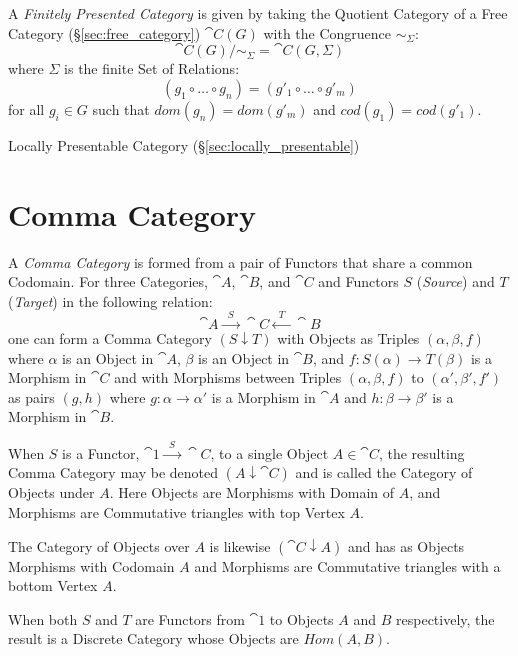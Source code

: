 A \emph{Finitely Presented Category} is given by taking the Quotient
Category of a Free Category (\S\ref{sec:free_category})
$\cat{C}(G)$ with the Congruence $\sim_\Sigma$:
\[
  \cat{C}(G) / \sim_{\Sigma} = \cat{C}(G,\Sigma)
\]
where $\Sigma$ is the finite Set of Relations:
\[
  (g_1 \circ \ldots \circ g_n) = (g'_1 \circ \ldots \circ g'_m)
\]
for all $g_i \in G$ such that $dom(g_n) = dom(g'_m)$ and $cod(g_1) =
cod(g'_1)$.

\fist Locally Presentable Category (\S\ref{sec:locally_presentable})



\section{Comma Category}\label{sec:comma_category}

A \emph{Comma Category} is formed from a pair of Functors that share a
common Codomain. For three Categories, $\cat{A}$, $\cat{B}$, and
$\cat{C}$ and Functors $S$ (\emph{Source}) and $T$ (\emph{Target}) in
the following relation:
\[
  \cat{A} \xrightarrow{\;\; S\;\;} \cat{C} \xleftarrow{\;\;
    T\;\;} \cat{B}
\]
one can form a Comma Category $(S \downarrow T)$ with Objects as
Triples $(\alpha, \beta, f)$ where $\alpha$ is an Object in
$\cat{A}$, $\beta$ is an Object in $\cat{B}$, and $f : S(\alpha)
\rightarrow T(\beta)$ is a Morphism in $\cat{C}$ and with Morphisms
between Triples $(\alpha, \beta, f)$ to $(\alpha', \beta', f')$ as
pairs $(g,h)$ where $g : \alpha \rightarrow \alpha'$ is a Morphism in
$\cat{A}$ and $h : \beta \rightarrow \beta'$ is a Morphism in
$\cat{B}$.

When $S$ is a Functor, $\cat{1} \xrightarrow{\;\;S\;\;}
\cat{C}$, to a single Object $A \in \cat{C}$, the resulting
Comma Category may be denoted $(A \downarrow \cat{C})$ and is
called the Category of Objects under $A$. Here Objects are Morphisms
with Domain of $A$, and Morphisms are Commutative triangles with top
Vertex $A$.

The Category of Objects over $A$ is likewise $(\cat{C} \downarrow
A)$ and has as Objects Morphisms with Codomain $A$ and Morphisms are
Commutative triangles with a bottom Vertex $A$.

When both $S$ and $T$ are Functors from $\cat{1}$ to Objects $A$
and $B$ respectively, the result is a Discrete Category whose Objects
are $Hom(A,B)$.

